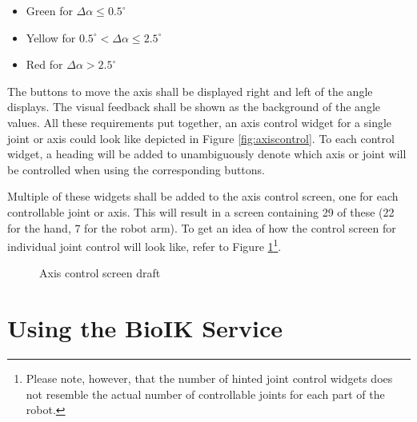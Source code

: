 \begin{itemize}
	\item Green for $\Delta\alpha \leq 0.5^\circ$
	\item Yellow for $0.5^\circ < \Delta\alpha \leq 2.5^\circ$
	\item Red for $\Delta\alpha > 2.5^\circ$ 
\end{itemize}

The buttons to move the axis shall be displayed right and left of the angle displays. The visual feedback shall be shown as the background of the angle values. All these requirements put together, an axis control widget for a single joint or axis could look like depicted in Figure \ref{fig:axiscontrol}. To each control widget, a heading will be added to unambiguously denote which axis or joint will be controlled when using the corresponding buttons.

Multiple of these widgets shall be added to the axis control screen, one for each controllable joint or axis. This will result in a screen containing 29 of these (22 for the hand, 7 for the robot arm). To get an idea of how the control screen for individual joint control will look like, refer to Figure \ref{fig:axiscontrol:screen}\footnote{Please note, however, that the number of hinted joint control widgets does not resemble the actual number of controllable joints for each part of the robot.}. 

\begin{figure}
	\caption{\label{fig:axiscontrol:screen}Axis control screen draft}
\end{figure}

\section{Using the BioIK Service}
\label{sec:robotarm:ctrl}

